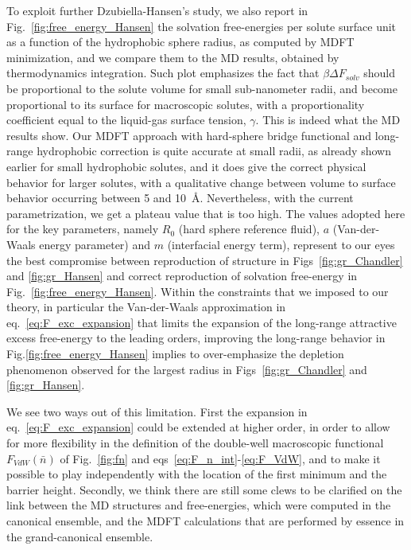 \documentclass[aip,jcp,showpacs,amsmath,amssymb,superscriptaddress]{revtex4-1}
\begin{document}
To exploit further Dzubiella-Hansen's study, we also report in Fig.~\ref{fig:free_energy_Hansen} the solvation free-energies per solute surface unit as a function of the hydrophobic sphere radius, as  computed by MDFT minimization, and  we compare them to the MD results, obtained by thermodynamics integration. Such plot emphasizes the fact that $\beta \Delta F_{solv}$ should be proportional to the solute volume for small sub-nanometer radii, and become proportional to its surface for macroscopic solutes, with a proportionality coefficient equal to the liquid-gas surface tension, $\gamma$. This is indeed what the MD results show. Our MDFT approach with hard-sphere bridge functional and long-range hydrophobic correction is quite accurate at small radii, as already shown earlier for small hydrophobic solutes, and it does give the correct physical behavior for larger solutes, with a qualitative change between volume to surface behavior occurring between 5 and 10~\AA. Nevertheless,  with the current parametrization, we get a plateau value that is too high. The values adopted here for the key parameters, namely  $R_0$ (hard sphere reference fluid), $a$ (Van-der-Waals energy parameter) and $m$ (interfacial energy term), represent to our eyes the best compromise between reproduction of structure in Figs~\ref{fig:gr_Chandler} and \ref{fig:gr_Hansen} and correct reproduction of solvation free-energy in Fig.~\ref{fig:free_energy_Hansen}. Within the constraints that we imposed to our theory, in particular the Van-der-Waals approximation in eq.~\ref{eq:F_exc_expansion} that limits the expansion of the long-range attractive excess free-energy to the leading orders, improving the long-range behavior in Fig.\ref{fig:free_energy_Hansen} implies to over-emphasize the depletion phenomenon observed for the largest radius in Figs~\ref{fig:gr_Chandler} and \ref{fig:gr_Hansen}.

We see two ways out of this limitation. First the expansion in eq.~\ref{eq:F_exc_expansion} could be extended at higher order, in order to allow for more flexibility in the  definition of the double-well macroscopic functional $F_{VdW}(\bar{n})$ of Fig.~\ref{fig:fn} and 
eqs~\ref{eq:F_n_int}-\ref{eq:F_VdW}, and to make it possible to play independently  with the location of the first minimum  and the barrier height. Secondly, we think there are still some clews to be clarified on the link between the MD  structures and free-energies, which were computed in the canonical ensemble, and the MDFT calculations that are performed by essence in the grand-canonical ensemble. 
\end{document}

